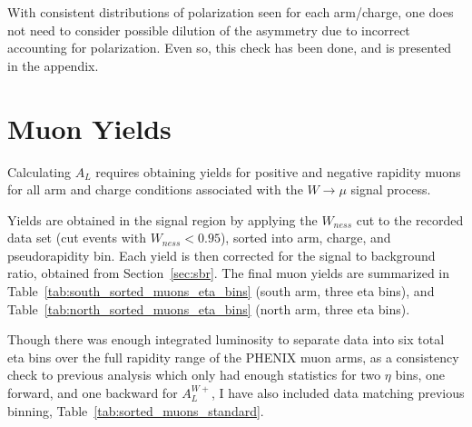 With consistent distributions of polarization seen for each arm/charge, one does
not need to consider possible dilution of the asymmetry due to incorrect
accounting for polarization. Even so, this check has been done, and is presented
in the appendix. 

\clearpage
\section{Muon Yields}

Calculating $A_L$ requires obtaining yields for positive and negative rapidity
muons for all arm and charge conditions associated with the $W\rightarrow\mu$
signal process. 

Yields are obtained in the signal region by applying the $W_{ness}$ cut to the
recorded data set (cut events with $W_{ness} < 0.95 $), sorted into arm, charge,
and pseudorapidity bin. Each yield is then corrected for the signal to
background ratio, obtained from Section~\ref{sec:sbr}. The final muon yields are
summarized in Table~\ref{tab:south_sorted_muons_eta_bins} (south arm, three eta
bins), and Table~\ref{tab:north_sorted_muons_eta_bins} (north arm, three eta
bins).

Though there was enough integrated luminosity to separate data into six total
eta bins over the full rapidity range of the PHENIX muon arms, as a consistency
check to previous analysis which only had enough statistics for two $\eta$ bins,
one forward, and one backward for $A_L^{W+}$, I have also included data matching
previous binning, Table~\ref{tab:sorted_muons_standard}.

